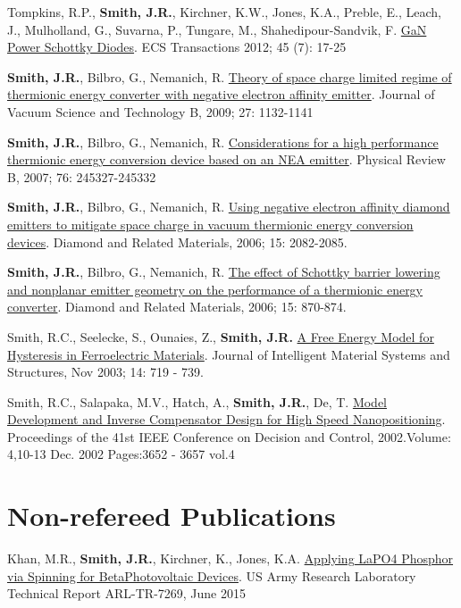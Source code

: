 Tompkins, R.P., \textbf{Smith, J.R.}, Kirchner, K.W., Jones, K.A.,
Preble, E., Leach, J., Mulholland, G., Suvarna, P., Tungare, M.,
Shahedipour-Sandvik, F. \href{http://dx.doi.org/10.1149/1.3701521}{GaN
Power Schottky Diodes}. ECS Transactions 2012; 45 (7): 17-25

\textbf{Smith, J.R.}, Bilbro, G., Nemanich, R.
\href{http://dx.doi.org/10.1116/1.3125282}{Theory of space charge
limited regime of thermionic energy converter with negative electron
affinity emitter}. Journal of Vacuum Science and Technology B, 2009; 27:
1132-1141

\textbf{Smith, J.R.}, Bilbro, G., Nemanich, R.
\href{http://dx.doi.org/10.1103/PhysRevB.76.245327}{Considerations for a
high performance thermionic energy conversion device based on an NEA
emitter}. Physical Review B, 2007; 76: 245327-245332

\textbf{Smith, J.R.}, Bilbro, G., Nemanich, R.
\href{http://dx.doi.org/10.1016/j.diamond.2006.09.011}{Using negative
electron affinity diamond emitters to mitigate space charge in vacuum
thermionic energy conversion devices}. Diamond and Related Materials,
2006; 15: 2082-2085.

\textbf{Smith, J.R.}, Bilbro, G., Nemanich, R.
\href{http://dx.doi.org/10.1016/j.diamond.2005.12.057}{The effect of
Schottky barrier lowering and nonplanar emitter geometry on the
performance of a thermionic energy converter}. Diamond and Related
Materials, 2006; 15: 870-874.

Smith, R.C., Seelecke, S., Ounaies, Z., \textbf{Smith, J.R.}
\href{http://dx.doi.org/10.1177/1045389X03038841}{A Free Energy Model
for Hysteresis in Ferroelectric Materials}. Journal of Intelligent
Material Systems and Structures, Nov 2003; 14: 719 - 739.

Smith, R.C., Salapaka, M.V., Hatch, A., \textbf{Smith, J.R.}, De, T.
\href{http://dx.doi.org/10.1109/CDC.2002.1184930}{Model Development and
Inverse Compensator Design for High Speed Nanopositioning}. Proceedings
of the 41st IEEE Conference on Decision and Control, 2002.Volume:
4,10-13 Dec. 2002 Pages:3652 - 3657 vol.4

\section{Non-refereed Publications}\label{non-refereed-publications}

Khan, M.R., \textbf{Smith, J.R.}, Kirchner, K., Jones, K.A.
\href{http://www.dtic.mil/docs/citations/ADA621659}{Applying LaPO4
Phosphor via Spinning for BetaPhotovoltaic Devices}. US Army Research
Laboratory Technical Report ARL-TR-7269, June 2015

